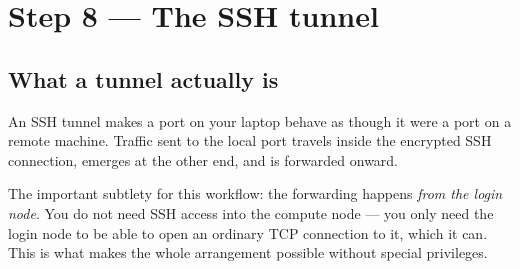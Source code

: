 \documentclass[11pt,a4paper]{article}
\begin{document}
\section{Step 8 --- The SSH tunnel}
\label{sec:tunnel}

\subsection{What a tunnel actually is}

An SSH tunnel makes a port on your laptop behave as though it were a port on a
remote machine. Traffic sent to the local port travels inside the encrypted SSH
connection, emerges at the other end, and is forwarded onward.

The important subtlety for this workflow: the forwarding happens \emph{from the
login node}. You do not need SSH access into the compute node --- you only need
the login node to be able to open an ordinary TCP connection to it, which it
can. This is what makes the whole arrangement possible without special
privileges.
\end{document}
